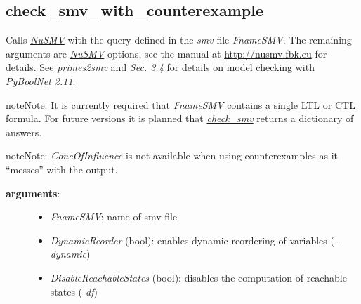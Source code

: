 \documentclass[letterpaper,10pt,english]{sphinxmanual}
\begin{document}
\subsection{check\_smv\_with\_counterexample}
\label{ModelChecking:id6}\label{ModelChecking:check-smv-with-counterexample}

\begin{fulllineitems}
\label{ModelChecking:PyBoolNet.ModelChecking.check_smv_with_counterexample}
Calls {\hyperref[Installation:installation-nusmv]{\emph{NuSMV}}} with the query defined in the \emph{smv} file \emph{FnameSMV}.
The remaining arguments are {\hyperref[Installation:installation-nusmv]{\emph{NuSMV}}} options, see the manual at \href{http://nusmv.fbk.eu}{http://nusmv.fbk.eu} for details.
See {\hyperref[ModelChecking:primes2smv]{\emph{primes2smv}}} and {\hyperref[Manual:sec-model-checking]{\emph{Sec. 3.4}}} for details on model checking with \emph{PyBoolNet 2.11}.

\begin{notice}{note}{Note:}
It is currently required that \emph{FnameSMV} contains a single LTL or CTL formula.
For future versions it is planned that {\hyperref[ModelChecking:check-smv]{\emph{check\_smv}}} returns a dictionary of answers.
\end{notice}

\begin{notice}{note}{Note:}
\emph{ConeOfInfluence} is not available when using counterexamples as it ``messes'' with the output.
\end{notice}
\begin{description}
\item[{\textbf{arguments}:}] \leavevmode\begin{itemize}
\item {} 
\emph{FnameSMV}: name of smv file

\item {} 
\emph{DynamicReorder} (bool): enables dynamic reordering of variables (\emph{-dynamic})

\item {} 
\emph{DisableReachableStates} (bool): disables the computation of reachable states (\emph{-df})

\end{itemize}


\end{description}
\end{fulllineitems}
\end{document}
